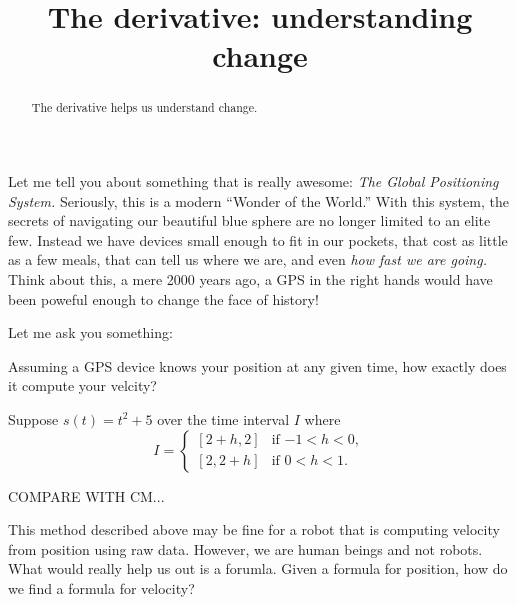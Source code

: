 \documentclass{ximera}
\title{The derivative: understanding change}
\begin{document}
\begin{abstract}
The derivative helps us understand change.
\end{abstract}
\maketitle



Let me tell you about something that is really awesome: \textit{The
  Global Positioning System.} Seriously, this is a modern ``Wonder of
the World.'' With this system, the secrets of navigating our beautiful
blue sphere are no longer limited to an elite few. Instead we have
devices small enough to fit in our pockets, that cost as little as a
few meals, that can tell us where we are, and even \textit{how fast we
  are going.} Think about this, a mere 2000 years ago, a GPS in the
right hands would have been poweful enough to change the face of
history!


Let me ask you something:

\begin{question}
Assuming a GPS device knows your position at any given time, how
exactly does it compute your velcity?
\begin{freeResponse}
\end{freeResponse}
\end{question}




Suppose $s(t) = t^2 + 5$ over the time interval $I$ where
\[
I = 
\begin{cases}
[2+h,2]  & \text{if $-1<h<0$}, \\ %
[2,2+h]  & \text{if $0<h<1$}. %
\end{cases}
\]


COMPARE WITH CM...


\begin{question}
This method described above may be fine for a robot that is computing
velocity from position using raw data. However, we are human beings
and not robots. What would really help us out is a forumla. Given a
formula for position, how do we find a formula for velocity?
\end{question}
\end{document}
